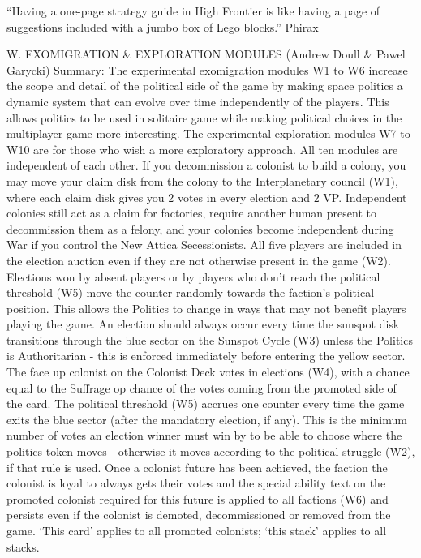 \documentclass[a4paper]{book}
\begin{document}
“Having a one-page strategy guide in High Frontier is like having a page of suggestions included with a jumbo box of Lego blocks.” Phirax

W. EXOMIGRATION \& EXPLORATION MODULES (Andrew Doull \& Pawel Garycki)
Summary: The experimental exomigration modules W1 to W6 increase the scope and detail of the political side of the game by making space politics a dynamic system that can evolve over time independently of the players. This allows politics to be used in solitaire game while making political choices in the multiplayer game more interesting. The experimental exploration modules W7 to W10 are for those who wish a more exploratory approach.  All ten modules are independent of each other.
If you decommission a colonist to build a colony, you may move your claim disk from the colony to the Interplanetary council (W1), where each claim disk gives you 2 votes in every election and 2 VP. Independent colonies still act as a claim for factories, require another human present to decommission them as a felony, and your colonies become independent during War if you control the New Attica Secessionists.
All five players are included in the election auction even if they are not otherwise present in the game (W2). Elections won by absent players or by players who don’t reach the political threshold (W5) move the counter randomly towards the faction’s political position. This allows the Politics to change in ways that may not benefit players playing the game.
An election should always occur every time the sunspot disk transitions through the blue sector on the Sunspot Cycle (W3) unless the Politics is Authoritarian - this is enforced immediately before entering the yellow sector.
The face up colonist on the Colonist Deck votes in elections (W4), with a chance equal to the Suffrage op chance of the votes coming from the promoted side of the card.
The political threshold (W5) accrues one counter every time the game exits the blue sector (after the mandatory election, if any). This is the minimum number of votes an election winner must win by to be able to choose where the politics token moves - otherwise it moves according to the political struggle (W2), if that rule is used. 
Once a colonist future has been achieved, the faction the colonist is loyal to always gets their votes and the special ability text on the promoted colonist required for this future is applied to all factions (W6) and persists even if the colonist is demoted, decommissioned or removed from the game. ‘This card’ applies to all promoted colonists; ‘this stack’ applies to all stacks.
\end{document}
